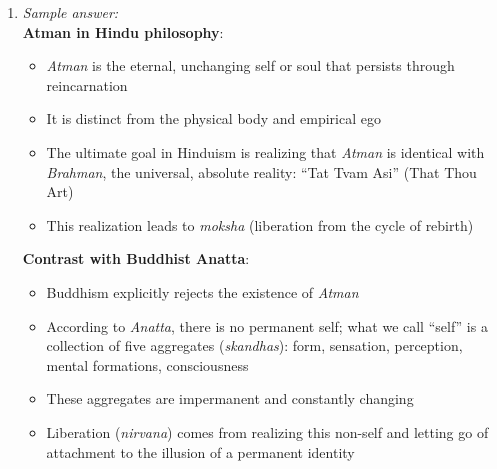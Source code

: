 \documentclass[11pt]{article}
\begin{document}
\begin{enumerate}[label=\textbf{\arabic*.}]
  \textbf{Differences}:
  \begin{itemize}
    \item \textbf{Foundation}: Kant grounds morality in autonomous reason and categorical imperatives; 
    Confucius grounds it in social relationships and tradition (\textit{li}, ritual propriety)
    \item \textbf{Focus}: Kant emphasizes abstract, universal principles independent of context; 
    Confucianism emphasizes particular relationships (filial piety, loyalty) and social harmony
    \item \textbf{Method}: Kant uses rational formalism; Confucianism uses exemplars and cultivation 
    of virtues like \textit{ren} (benevolence)
    \item \textbf{Application}: Kant seeks absolute moral laws; Confucianism allows flexibility 
    based on relationships and circumstances
  \end{itemize}

  \item \emph{Sample answer:}\\
  \textbf{Atman in Hindu philosophy}:
  \begin{itemize}
    \item \textit{Atman} is the eternal, unchanging self or soul that persists through reincarnation
    \item It is distinct from the physical body and empirical ego
    \item The ultimate goal in Hinduism is realizing that \textit{Atman} is identical with \textit{Brahman}, 
    the universal, absolute reality: ``Tat Tvam Asi'' (That Thou Art)
    \item This realization leads to \textit{moksha} (liberation from the cycle of rebirth)
  \end{itemize}

  \textbf{Contrast with Buddhist Anatta}:
  \begin{itemize}
    \item Buddhism explicitly rejects the existence of \textit{Atman}
    \item According to \textit{Anatta}, there is no permanent self; what we call ``self'' is a 
    collection of five aggregates (\textit{skandhas}): form, sensation, perception, mental formations, 
    consciousness
    \item These aggregates are impermanent and constantly changing
    \item Liberation (\textit{nirvana}) comes from realizing this non-self and letting go of attachment 
    to the illusion of a permanent identity
  \end{itemize}


\end{enumerate}
\end{document}
